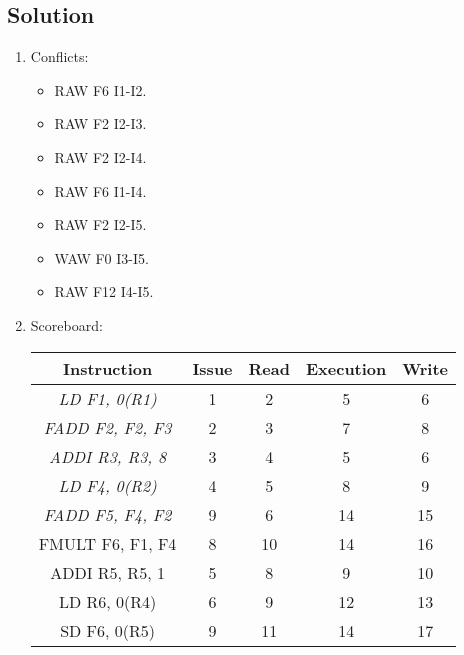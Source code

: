 \subsection*{Solution}
\begin{enumerate}
    \item Conflicts:
        \begin{itemize}
        \item RAW F6 I1-I2.
        \item RAW F2 I2-I3.
        \item RAW F2 I2-I4.
        \item RAW F6 I1-I4.
        \item RAW F2 I2-I5.
        \item WAW F0 I3-I5.
        \item RAW F12 I4-I5.
        \end{itemize}
    \item Scoreboard:
        \begin{table}[H]
            \centering
            \begin{tabular}{c|cccc}
            \textbf{Instruction}     & \textbf{Issue} & \textbf{Read} & \textbf{Execution} & \textbf{Write} \\ \hline
            \textit{LD F1, 0(R1)}    & 1              & 2             & 5                  & 6              \\
            \textit{FADD F2, F2, F3} & 2              & 3             & 7                  & 8              \\
            \textit{ADDI R3, R3, 8}  & 3              & 4             & 5                  & 6              \\
            \textit{LD F4, 0(R2)}    & 4              & 5             & 8                  & 9              \\
            \textit{FADD F5, F4, F2} & 9              & 6             & 14                 & 15             \\
            FMULT F6, F1, F4         & 8              & 10            & 14                 & 16             \\
            ADDI R5, R5, 1           & 5              & 8             & 9                  & 10             \\
            LD R6, 0(R4)             & 6              & 9             & 12                 & 13             \\
            SD F6, 0(R5)             & 9              & 11            & 14                 & 17             \\

\end{tabular}
\end{table}
\end{enumerate}
